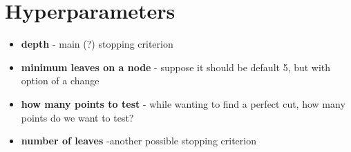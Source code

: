 \documentclass{article}
\begin{document}
\section{Hyperparameters}
\begin{itemize}
\item \textbf{depth} - main (?) stopping criterion
\item \textbf{minimum leaves on a node} - suppose it should be default 5, but with option of a change
\item \textbf{how many points to test} - while wanting to find a perfect cut, how many points do we want to test?
\item \textbf{number of leaves} -another possible stopping criterion
\end{itemize}
\end{document}

